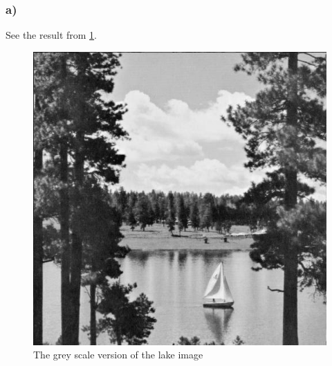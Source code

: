 \subsubsection*{a)}
See the result from \cref{fig:greyscale}. 
\begin{figure}[]
    \centering
    \includegraphics[width=1.00\textwidth]{figures/image_processed/lake_greyscale.jpg}
    \caption{The grey scale version of the lake image}
    \label{fig:greyscale}
\end{figure}

